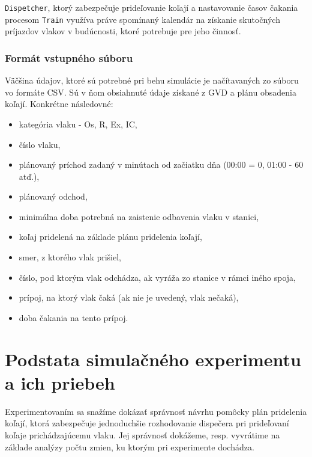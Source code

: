 \documentclass[12pt,a4paper,titlepage,final]{article}
\begin{document}
\texttt{Dispetcher}, ktorý zabezpečuje prideľovanie koľají a nastavovanie časov čakania procesom \texttt{Train} využíva práve spomínaný kalendár na získanie skutočných príjazdov vlakov v budúcnosti, ktoré potrebuje pre jeho činnosť.

\subsubsection{Formát vstupného súboru}

Väčšina údajov, ktoré sú potrebné pri behu simulácie je načítavaných zo súboru vo formáte CSV.
Sú v ňom obsiahnuté údaje získané z GVD a plánu obsadenia koľají. Konkrétne následovné:

\begin{itemize}
	\item kategória vlaku - Os, R, Ex, IC,
	\item číslo vlaku,
	\item plánovaný príchod zadaný v minútach od začiatku dňa (00:00 = 0, 01:00 - 60 atď.),
	\item plánovaný odchod,
	\item minimálna doba potrebná na zaistenie odbavenia vlaku v stanici,
	\item koľaj pridelená na základe plánu pridelenia koľají,
	\item smer, z ktorého vlak prišiel,
	\item číslo, pod ktorým vlak odchádza, ak vyráža zo stanice v rámci iného spoja,
	\item prípoj, na ktorý vlak čaká (ak nie je uvedený, vlak nečaká),
	\item doba čakania na tento prípoj.
\end{itemize}

\section{Podstata simulačného experimentu a ich priebeh}

Experimentovaním sa snažíme dokázať správnosť návrhu pomôcky plán pridelenia koľají,
ktorá zabezpečuje jednoduchšie rozhodovanie dispečera pri prideľovaní koľaje prichádzajúcemu vlaku. Jej správnosť dokážeme, resp. vyvrátime na základe analýzy počtu zmien, ku ktorým pri experimente dochádza.

\end{document}
